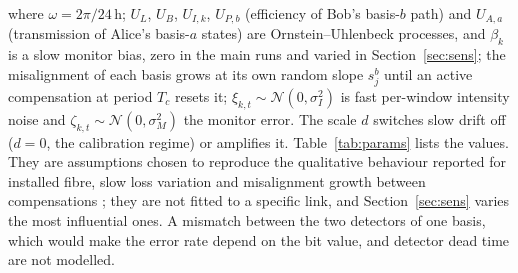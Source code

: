 where $\omega=2\pi/24\,$h; $U_L$, $U_B$, $U_{I,k}$, $U_{P,b}$ (efficiency of Bob's basis-$b$ path) and $U_{A,a}$ (transmission of Alice's basis-$a$ states) are Ornstein--Uhlenbeck processes, and $\beta_k$ is a slow monitor bias, zero in the main runs and varied in Section~\ref{sec:sens}; the misalignment of each basis grows at its own random slope $s_j^b$ until an active compensation at period $T_c$ resets it; $\xi_{k,t}\sim\mathcal{N}(0,\sigma_I^2)$ is fast per-window intensity noise and $\zeta_{k,t}\sim\mathcal{N}(0,\sigma_M^2)$ the monitor error. The scale $d$ switches slow drift off ($d=0$, the calibration regime) or amplifies it. Table~\ref{tab:params} lists the values. They are assumptions chosen to reproduce the qualitative behaviour reported for installed fibre, slow loss variation and misalignment growth between compensations \cite{dixon2010,dynes2012}; they are not fitted to a specific link, and Section~\ref{sec:sens} varies the most influential ones. A mismatch between the two detectors of one basis, which would make the error rate depend on the bit value, and detector dead time are not modelled.


